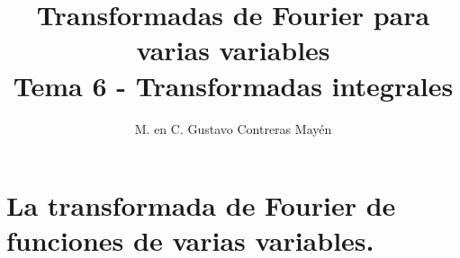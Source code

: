 
\title{Transformadas de Fourier para varias variables \\ \large {Tema 6 - Transformadas integrales} \vspace{-3ex}}
\author{M. en C. Gustavo Contreras Mayén}
\date{ }

\vspace{-4cm}
\maketitle
\fontsize{14}{14}\selectfont
\tableofcontents
\newpage

\section{La transformada de Fourier de funciones de varias variables.}


